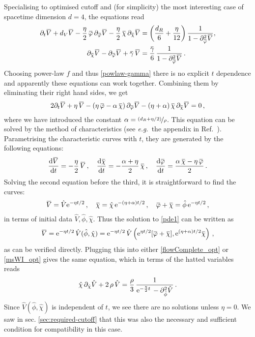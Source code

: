 \documentclass[11pt]{book}
\newcommand{\overbar}[1]{\mkern 1.5mu\overline{\mkern-1.5mu#1\mkern-1.5mu}\mkern 1.5mu}
\newcommand{\bV}{\overbar V}
\newcommand{\bp}{\overbar \varphi}
\newcommand{\bg}{\overbar \gamma}
\newcommand{\bc}{\overbar \chi}
\newcommand\eg{\textit{e.g.}\ }
\newcommand{\hV}{\hat V}
\newcommand{\hp}{\hat \phi}
\newcommand{\hc}{\hat \chi}
\numberwithin{equation}{chapter}
\begin{document}
Specialising to optimised cutoff and (for simplicity) the most interesting case of spacetime dimension $d=4$,
the equations read
\begin{align}
  \label{flowComplete_opt}
  \partial_t \bV + d_V \bV - \frac{\eta}{2} \, \bp \, \partial_{\bp} \bV -\frac{\eta}{2} \, \bc \,
  \partial_{\bc} \bV
  &= \left(  \frac{d_R}{6} + \frac{\eta}{12} \right) \frac{1}{1 -  \partial^2_{\bp} \bV},\\
  \label{msWI_opt}
  \partial_{\bc} \bV - \partial_{\bp} \bV + \bg \, \bV
  &= \frac{\bg}{6} \, \frac{1}{1 - \partial^2_{\bp} \bV}\,.
\end{align}
Choosing power-law $f$ and thus \eqref{powlaw-gamma} there is no explicit $t$ dependence and apparently
these equations can work together. Combining them by eliminating their right hand sides, we get
\begin{align}
  \label{pde1}
  2\partial_t \bV + \eta \, \bV - \left(\eta \, \bp - \alpha \, \bc\right)\partial_{\bp} \bV - (\eta+\alpha) \, \bc \, \partial_{\bc} \bV = 0\,,
\end{align}
where we have introduced the constant $\alpha = \nicefrac{(d_R+\eta/2)}{\rho}$.
This equation can be solved by the method of characteristics
(see \eg the appendix in Ref.~\cite{Dietz:2015owa}).
Parametrising the characteristic curves with $t$, they are generated by the following equations:
\begin{align}
  \frac{\mathrm d\bV}{\mathrm dt} = -\frac{\eta}{2} \, \bV\,,
  \quad
  \frac{\mathrm d\bc}{\mathrm dt}=-\frac{\alpha+\eta}{2} \, \bc\,,
  \quad
  \frac{\mathrm d\bp}{\mathrm dt}=\frac{\alpha\,\bc-\eta\,\bp}{2}\,.
\end{align}
Solving the second equation before the third, it is straightforward to find the curves:
\begin{align}
  \bV = \hV {\rm e}^{-\eta t/2}\,,\quad \bc = \hc\, {\rm e}^{-(\eta+\alpha)t/2}\,,\quad \bp+\bc = \hp\, {\rm e}^{-\eta t/2}\,,
\end{align}
in terms of initial data $\hV,\hp,\hc$.
Thus the solution to \eqref{pde1} can be written as
\begin{align}
  \bV ={\rm e}^{-\eta t/2}\, \hV(\hp,\hc) ={\rm e}^{-\eta t/2} \,\hV\left({\rm e}^{\eta t/2}[\bp+\bc],{\rm e}^{(\eta+\alpha)t/2}\bc\right)\,,
\end{align}
as can be verified directly. Plugging this into either \eqref{flowComplete_opt} or \eqref{msWI_opt}
gives the same equation, which in terms of the hatted variables reads
\begin{align}
  \hc \, \partial_{\hc}\hV + 2 \, \rho \, \hV = \frac{\rho}{3} \, \frac{1}{{\rm e}^{-\frac{\eta}{2} t} \,-\partial^2_{\hp}\hV}\,.
\end{align}
Since $\hV(\hp,\hc)$ is independent of $t$, we see there are no solutions unless $\eta=0$.
We saw in sec. \ref{sec:required-cutoff} that this was also the necessary and sufficient condition for
compatibility in this case.
\end{document}
